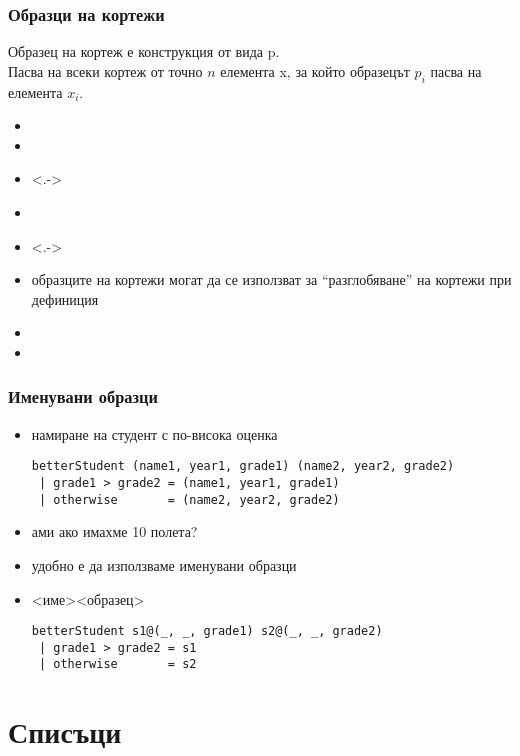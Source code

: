 \documentclass[alsotrans]{beamerswitch}
\begin{document}
\begin{frame}[fragile]
  \frametitle{Образци на кортежи}

  Образец на кортеж е конструкция от вида \tuple p.\\\pause
  Пасва на всеки кортеж от точно $n$ елемента \tuple x, за който образецът $p_i$ пасва на елемента $x_i$.
  \onslide<+->
  \begin{itemize}[<+->]
  \item {}
  \item {}
  \item<.-> 
  \item {}
  \item<.-> 
  \item образците на кортежи могат да се използват за ``разглобяване'' на кортежи при дефиниция
  \item {}
  \item {}
  \end{itemize}
\end{frame}

\begin{frame}[fragile]
  \frametitle{Именувани образци}

  \begin{itemize}[<+->]
  \item намиране на студент с по-висока оценка
\begin{lstlisting}
betterStudent (name1, year1, grade1) (name2, year2, grade2)
 | grade1 > grade2 = (name1, year1, grade1)
 | otherwise       = (name2, year2, grade2)
\end{lstlisting}
  \item ами ако имахме 10 полета?
  \item удобно е да използваме \alert{именувани образци}
  \item{} <име>\tta@<образец> \onslide<+->
\lstset{escapechar=!}
\begin{lstlisting}
betterStudent s1@(_, _, grade1) s2@(_, _, grade2)
 | grade1 > grade2 = s1
 | otherwise       = s2
\end{lstlisting}
\lstset{escapechar=@}
  \end{itemize}
\end{frame}

\section{Списъци}
\end{document}
